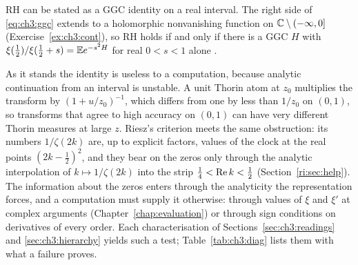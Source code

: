 RH can be stated as a GGC identity on a real interval. The right side of \eqref{eq:ch3:ggc} extends to a holomorphic nonvanishing function on $\mathbb{C}\setminus(-\infty,0]$ (Exercise~\ref{ex:ch3:cont}), so RH holds if and only if there is a GGC $H$ with $\xi(\frac12)/\xi(\frac12+s)=\mathbb{E} e^{-s^2H}$ for real $0<s<1$ alone \cite[Proposition 3.3]{P17}.

As it stands the identity is useless to a computation, because analytic continuation from an interval is unstable. A unit Thorin atom at $z_0$ multiplies the transform by $(1+u/z_0)^{-1}$, which differs from one by less than $1/z_0$ on $(0,1)$, so transforms that agree to high accuracy on $(0,1)$ can have very different Thorin measures at large $z$. Riesz's criterion meets the same obstruction: its numbers $1/\zeta(2k)$ are, up to explicit factors, values of the clock at the real points $(2k-\frac12)^2$, and they bear on the zeros only through the analytic interpolation of $k\mapsto1/\zeta(2k)$ into the strip $\frac14<\operatorname{Re} k<\frac12$ (Section~\ref{ri:sec:help}). The information about the zeros enters through the analyticity the representation forces, and a computation must supply it otherwise: through values of $\xi$ and $\xi'$ at complex arguments (Chapter~\ref{chap:evaluation}) or through sign conditions on derivatives of every order. Each characterisation of Sections~\ref{sec:ch3:readings} and \ref{sec:ch3:hierarchy} yields such a test; Table~\ref{tab:ch3:diag} lists them with what a failure proves.

